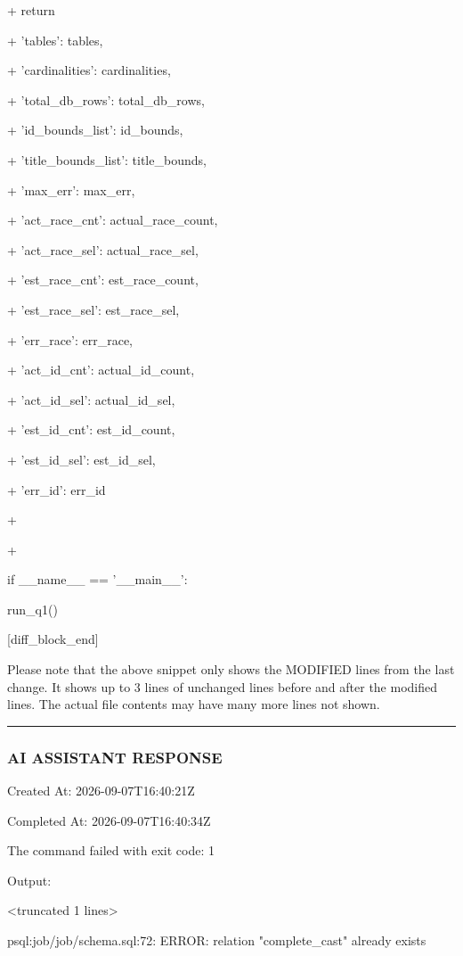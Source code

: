 \documentclass[11pt,a4paper]{article}
\begin{document}
+    return {

+        'tables': tables,

+        'cardinalities': cardinalities,

+        'total\_db\_rows': total\_db\_rows,

+        'id\_bounds\_list': id\_bounds,

+        'title\_bounds\_list': title\_bounds,

+        'max\_err': max\_err,

+        'act\_race\_cnt': actual\_race\_count,

+        'act\_race\_sel': actual\_race\_sel,

+        'est\_race\_cnt': est\_race\_count,

+        'est\_race\_sel': est\_race\_sel,

+        'err\_race': err\_race,

+        'act\_id\_cnt': actual\_id\_count,

+        'act\_id\_sel': actual\_id\_sel,

+        'est\_id\_cnt': est\_id\_count,

+        'est\_id\_sel': est\_id\_sel,

+        'err\_id': err\_id

+    }

+

if \_\_name\_\_ == '\_\_main\_\_':

run\_q1()


[diff\_block\_end]


Please note that the above snippet only shows the MODIFIED lines from the last change. It shows up to 3 lines of unchanged lines before and after the modified lines. The actual file contents may have many more lines not shown.


\hrule

\subsubsection{AI ASSISTANT RESPONSE}

Created At: 2026-09-07T16:40:21Z

Completed At: 2026-09-07T16:40:34Z


The command failed with exit code: 1

Output:

<truncated 1 lines>

psql:job/job/schema.sql:72: ERROR:  relation "complete\_cast" already exists
\end{document}
